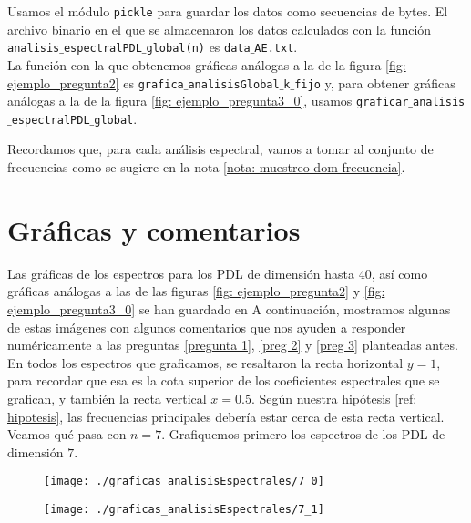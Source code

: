 Usamos el 
módulo \texttt{pickle} para guardar los datos como secuencias
de bytes. El archivo binario en el que se almacenaron los
datos calculados con la función 
\texttt{analisis$\_$espectralPDL$\_$global(n)}
es \texttt{data$\_$AE.txt}. \\

La función con la que obtenemos gráficas análogas 
a la de la figura 
\ref{fig: ejemplo_pregunta2} es
\texttt{grafica$\_$analisisGlobal$\_$k$\_$fijo}
y, para obtener gráficas análogas a la de la figura
\ref{fig: ejemplo_pregunta3_0},
usamos \texttt{graficar$\_$analisis$\_$espectralPDL$\_$global}.

Recordamos que,
para cada análisis espectral,
vamos a tomar al conjunto de 
frecuencias 
como se sugiere en la nota \ref{nota: muestreo dom frecuencia}.

\section{Gráficas y comentarios}
Las gráficas de los espectros
para los PDL de dimensión hasta $40$, así
como gráficas análogas a las de las figuras
\ref{fig: ejemplo_pregunta2}
y 
\ref{fig: ejemplo_pregunta3_0}
se han guardado en 
A continuación, mostramos algunas
de estas imágenes con algunos comentarios
que nos ayuden a responder numéricamente a 
las preguntas
\ref{pregunta 1}, \ref{preg 2} y \ref{preg 3}
planteadas antes. \\

En todos los espectros que graficamos,
se resaltaron la recta horizontal
$y = 1$, para recordar que esa es la cota
superior de los coeficientes espectrales que
se grafican, 
y también la recta vertical $x = 0.5$. Según nuestra
hipótesis \ref{ref: hipotesis}, las frecuencias
principales debería estar cerca de esta recta vertical. \\

Veamos qué pasa con $n=7$.
Grafiquemos primero los espectros
de los PDL de dimensión $7$.

\begin{figure}[H]
	\centering
	\texttt{[image: ./graficas\_analisisEspectrales/7\_0]} 
\end{figure}	

\begin{figure}[H]
	\centering
	\texttt{[image: ./graficas\_analisisEspectrales/7\_1]} 
\end{figure}	

